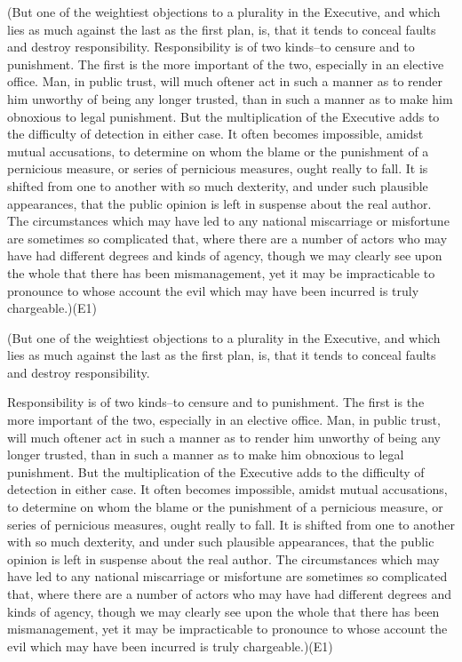 (But one of the weightiest objections to a plurality in the Executive, and which lies as much against the last as the first plan, is, that it tends to conceal faults and destroy responsibility. Responsibility is of two kinds--to censure and to punishment. The first is the more important of the two, especially in an elective office. Man, in public trust, will much oftener act in such a manner as to render him unworthy of being any longer trusted, than in such a manner as to make him obnoxious to legal punishment. But the multiplication of the Executive adds to the difficulty of detection in either case. It often becomes impossible, amidst mutual accusations, to determine on whom the blame or the punishment of a pernicious measure, or series of pernicious measures, ought really to fall. It is shifted from one to another with so much dexterity, and under such plausible appearances, that the public opinion is left in suspense about the real author. The circumstances which may have led to any national miscarriage or misfortune are sometimes so complicated that, where there are a number of actors who may have had different degrees and kinds of agency, though we may clearly see upon the whole that there has been mismanagement, yet it may be impracticable to pronounce to whose account the evil which may have been incurred is truly chargeable.)(E1)

(But one of the weightiest objections to a plurality in the Executive, and which lies as much against the last as the first plan, is, that it tends to conceal faults and destroy responsibility.

Responsibility is of two kinds--to censure and to punishment. The first is the more important of the two, especially in an elective office. Man, in public trust, will much oftener act in such a manner as to render him unworthy of being any longer trusted, than in such a manner as to make him obnoxious to legal punishment. But the multiplication of the Executive adds to the difficulty of detection in either case. It often becomes impossible, amidst mutual accusations, to determine on whom the blame or the punishment of a pernicious measure, or series of pernicious measures, ought really to fall. It is shifted from one to another with so much dexterity, and under such plausible appearances, that the public opinion is left in suspense about the real author. The circumstances which may have led to any national miscarriage or misfortune are sometimes so complicated that, where there are a number of actors who may have had different degrees and kinds of agency, though we may clearly see upon the whole that there has been mismanagement, yet it may be impracticable to pronounce to whose account the evil which may have been incurred is truly chargeable.)(E1)

